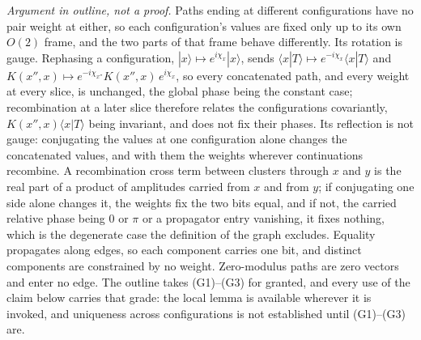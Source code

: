 \noindent\textit{Argument in outline, not a proof.} Paths ending at different configurations have no pair weight at either, so each configuration's values are fixed only up to its own $O(2)$ frame, and the two parts of that frame behave differently. Its rotation is gauge. Rephasing a configuration, $|x\rangle \mapsto e^{i\chi_x}|x\rangle$, sends $\langle x|T\rangle \mapsto e^{-i\chi_x}\langle x|T\rangle$ and $K(x'',x) \mapsto e^{-i\chi_{x''}} K(x'',x)\, e^{i\chi_x}$, so every concatenated path, and every weight at every slice, is unchanged, the global phase being the constant case; recombination at a later slice therefore relates the configurations covariantly, $K(x'',x)\langle x|T\rangle$ being invariant, and does not fix their phases. Its reflection is not gauge: conjugating the values at one configuration alone changes the concatenated values, and with them the weights wherever continuations recombine. A recombination cross term between clusters through $x$ and $y$ is the real part of a product of amplitudes carried from $x$ and from $y$; if conjugating one side alone changes it, the weights fix the two bits equal, and if not, the carried relative phase being $0$ or $\pi$ or a propagator entry vanishing, it fixes nothing, which is the degenerate case the definition of the graph excludes. Equality propagates along edges, so each component carries one bit, and distinct components are constrained by no weight. Zero-modulus paths are zero vectors and enter no edge. The outline takes (G1)--(G3) for granted, and every use of the claim below carries that grade: the local lemma is available wherever it is invoked, and uniqueness across configurations is not established until (G1)--(G3) are.


